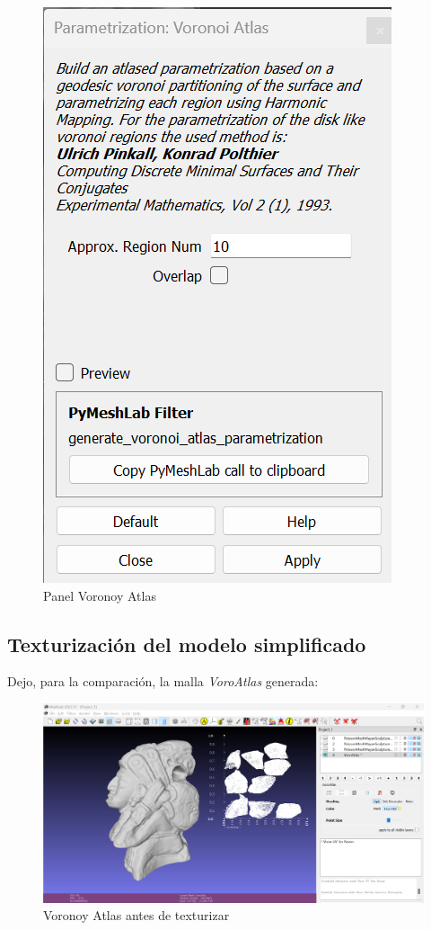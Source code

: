 \documentclass[options]{article}
\begin{document}
\begin{figure}[H]
    \centering
    \includegraphics[scale=0.34]{images/parametrizacion_01.png}
    \caption{Panel Voronoy Atlas}
\end{figure}

\subsection{Texturización del modelo simplificado}

Dejo, para la comparación, la malla \textit{VoroAtlas} generada:

\begin{figure}[H]
    \centering
    \includegraphics[scale=0.34]{images/textura_01.png}
    \caption{Voronoy Atlas antes de texturizar}
\end{figure}
\end{document}
